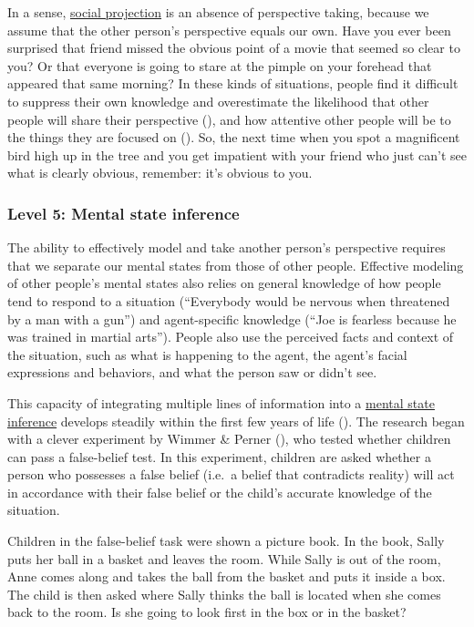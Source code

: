 \documentclass[
]{krantz}
\begin{document}
In a sense, \hyperref[social-projection]{social projection} is an absence of perspective taking, because we assume that the other person's perspective equals our own. Have you ever been surprised that friend missed the obvious point of a movie that seemed so clear to you? Or that everyone is going to stare at the pimple on your forehead that appeared that same morning? In these kinds of situations, people find it difficult to suppress their own knowledge and overestimate the likelihood that other people will share their perspective (), and how attentive other people will be to the things they are focused on (). So, the next time when you spot a magnificent bird high up in the tree and you get impatient with your friend who just can't see what is clearly obvious, remember: it's obvious to you.

\subsubsection*{Level 5: Mental state inference}\label{level-5-mental-state-inference}


The ability to effectively model and take another person's perspective requires that we separate our mental states from those of other people. Effective modeling of other people's mental states also relies on general knowledge of how people tend to respond to a situation (``Everybody would be nervous when threatened by a man with a gun'') and agent-specific knowledge (``Joe is fearless because he was trained in martial arts''). People also use the perceived facts and context of the situation, such as what is happening to the agent, the agent's facial expressions and behaviors, and what the person saw or didn't see.

This capacity of integrating multiple lines of information into a \hyperref[mental-state-inference]{mental state inference} develops steadily within the first few years of life (). The research began with a clever experiment by Wimmer \& Perner (), who tested whether children can pass a false-belief test. In this experiment, children are asked whether a person who possesses a false belief (i.e.~a belief that contradicts reality) will act in accordance with their false belief or the child's accurate knowledge of the situation.

Children in the false-belief task were shown a picture book. In the book, Sally puts her ball in a basket and leaves the room. While Sally is out of the room, Anne comes along and takes the ball from the basket and puts it inside a box. The child is then asked where Sally thinks the ball is located when she comes back to the room. Is she going to look first in the box or in the basket?
\end{document}
